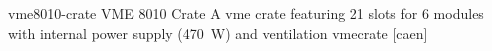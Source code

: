 \newglsXequipment%
{vme8010-crate}%
{VME 8010 Crate}%
{A \gls{vme} crate featuring 21 slots for \SI{6}{\rackunit} modules with internal power supply (\SI{470}{\watt}) and ventilation}%
{vmecrate}%
[caen]%